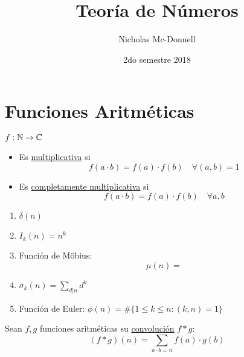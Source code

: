 

\title{Teoría de Números}
\author{Nicholas Mc-Donnell}
\date{2do semestre 2018}



    \maketitle
    \newpage

    \tableofcontents

    \newpage
    \section{Funciones Aritméticas}
    \begin{defn}
        $f:\mathbb{N}\xrightarrow[]{}\mathbb{C}$
        \begin{itemize}
            \item Es \underline{multiplicativa} si
            \[f(a\cdot b)=f(a)\cdot f(b)\quad \forall (a,b)=1\]

            \item Es \underline{completamente multiplicativa} si
            \[f(a\cdot b)=f(a)\cdot f(b)\quad \forall a,b\]
        \end{itemize}
    \end{defn}
    \begin{ejm}
        \begin{enumerate}[label=(\alph*)]
            \item $\delta(n)$

            \item $I_k(n)=n^k$

            \item Función de Möbius:
            \[\mu(n)=\]

            \item $\sigma_k(n)=\sum_{d|n}d^k$

            \item Función de Euler:
            $\phi(n)=\#\{1\leq k\leq n: (k,n) =1\}$
        \end{enumerate}
    \end{ejm}
    \begin{defn}[Convolución]
        Sean $f,g$ funciones aritméticas su \underline{convolución} $f*g$:
        \[(f*g)(n)=\sum_{a\cdot b=n}f(a)\cdot g(b)\]
    \end{defn}
